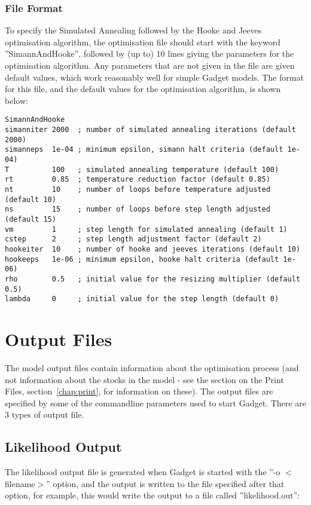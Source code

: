 \documentclass [a4paper, 10pt]{book}
\begin{document}
\subsection{File Format}
To specify the Simulated Annealing followed by the Hooke and Jeeves optimisation algorithm, the optimisation file should start with the keyword ''SimannAndHooke'', followed by (up to) 10 lines giving the parameters for the optimisation algorithm.  Any parameters that are not given in the file are given default values, which work reasonably well for simple Gadget models.  The format for this file, and the default values for the optimisation algorithm, is shown below:

\begin{verbatim}
SimannAndHooke
simanniter 2000  ; number of simulated annealing iterations (default 2000)
simanneps  1e-04 ; minimum epsilon, simann halt criteria (default 1e-04)
T          100   ; simulated annealing temperature (default 100)
rt         0.85  ; temperature reduction factor (default 0.85)
nt         10    ; number of loops before temperature adjusted (default 10)
ns         15    ; number of loops before step length adjusted (default 15)
vm         1     ; step length for simulated annealing (default 1)
cstep      2     ; step length adjustment factor (default 2)
hookeiter  10    ; number of hooke and jeeves iterations (default 10)
hookeeps   1e-06 ; minimum epsilon, hooke halt criteria (default 1e-06)
rho        0.5   ; initial value for the resizing multiplier (default 0.5)
lambda     0     ; initial value for the step length (default 0)
\end{verbatim}

\chapter{Output Files}\label{chap:output}
The model output files contain information about the optimisation process (and not information about the stocks in the model - see the section on the Print Files, section~\ref{chap:print}, for information on these).  The output files are specified by some of the commandline parameters used to start Gadget.  There are 3 types of output file.

\section{Likelihood Output}\label{sec:likelihoodoutput}
The likelihood output file is generated when Gadget is started with the ''-o $<$filename$>$'' option, and the output is written to the file specified after that option, for example, this would write the output to a file called ''likelihood.out'':
\end{document}
